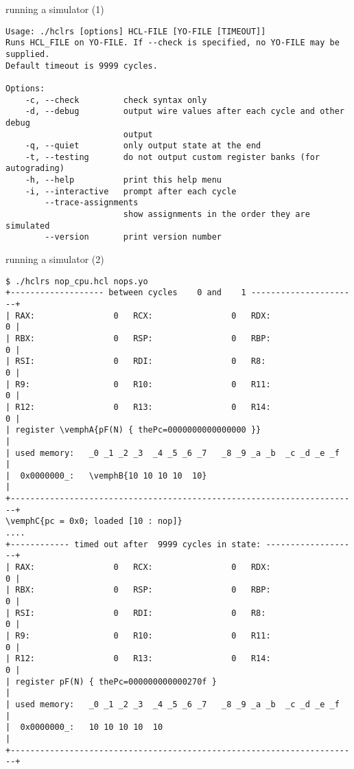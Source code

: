 \begin{frame}[fragile,label=runSim1]{running a simulator (1)}
    \begin{itemize}
    \vspace{.25cm}
\begin{Verbatim}[fontsize=\fontsize{8}{9}\selectfont]
Usage: ./hclrs [options] HCL-FILE [YO-FILE [TIMEOUT]]
Runs HCL_FILE on YO-FILE. If --check is specified, no YO-FILE may be supplied.
Default timeout is 9999 cycles.

Options:
    -c, --check         check syntax only
    -d, --debug         output wire values after each cycle and other debug
                        output
    -q, --quiet         only output state at the end
    -t, --testing       do not output custom register banks (for autograding)
    -h, --help          print this help menu
    -i, --interactive   prompt after each cycle
        --trace-assignments 
                        show assignments in the order they are simulated
        --version       print version number
\end{Verbatim}
    \end{itemize}
\end{frame}

\begin{frame}[fragile,label=runSim2]{running a simulator (2)}
\begin{Verbatim}[fontsize=\fontsize{8}{9}\selectfont,commandchars=\\\{\}]
$ ./hclrs nop_cpu.hcl nops.yo
+------------------- between cycles    0 and    1 ----------------------+
| RAX:                0   RCX:                0   RDX:                0 |
| RBX:                0   RSP:                0   RBP:                0 |
| RSI:                0   RDI:                0   R8:                 0 |
| R9:                 0   R10:                0   R11:                0 |
| R12:                0   R13:                0   R14:                0 |
| register \vemphA{pF(N) { thePc=0000000000000000 }}                             |
| used memory:   _0 _1 _2 _3  _4 _5 _6 _7   _8 _9 _a _b  _c _d _e _f    |
|  0x0000000_:   \vemphB{10 10 10 10  10}                                        |
+-----------------------------------------------------------------------+
\vemphC{pc = 0x0; loaded [10 : nop]}
....
+------------ timed out after  9999 cycles in state: -------------------+
| RAX:                0   RCX:                0   RDX:                0 |
| RBX:                0   RSP:                0   RBP:                0 |
| RSI:                0   RDI:                0   R8:                 0 |
| R9:                 0   R10:                0   R11:                0 |
| R12:                0   R13:                0   R14:                0 |
| register pF(N) { thePc=000000000000270f }                             |
| used memory:   _0 _1 _2 _3  _4 _5 _6 _7   _8 _9 _a _b  _c _d _e _f    |
|  0x0000000_:   10 10 10 10  10                                        |
+-----------------------------------------------------------------------+
\end{Verbatim}
\end{frame}

